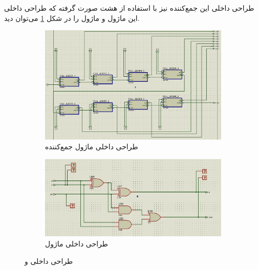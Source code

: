 \documentclass[12pt,onecolumn,a4paper,fleqn]{article}
\begin{document}
	طراحی داخلی این جمع‌کننده نیز با استفاده از هشت  صورت گرفته که طراحی داخلی این ماژول و ماژول  را در شکل \ref{fig:adder_inner} می‌توان دید.
	\begin{figure}[H]
		\begin{subfigure}{0.6\textwidth}
			\centering
			\includegraphics[width=\textwidth]{source/adder_inner.png}
			\caption{طراحی داخلی ماژول جمع‌کننده}
		\end{subfigure}
		\hfill
		\begin{subfigure}{0.35\textwidth}
			\centering
			\includegraphics[width=\textwidth]{source/fulladder_inner.png}
			\caption{طراحی داخلی ماژول }
		\end{subfigure}
		\caption{طراحی داخلی  و }
		\label{fig:adder_inner}
	\end{figure}
\end{document}
